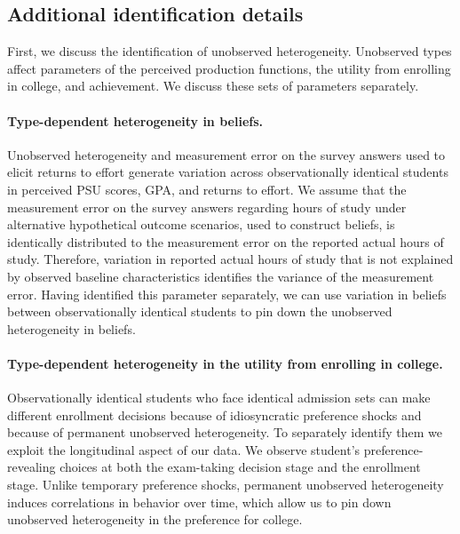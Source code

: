 \subsection{Additional identification details}\label{sec:appendix_identification}

First, we discuss the identification of unobserved heterogeneity. Unobserved types affect parameters of the perceived production functions, the utility from enrolling in college, and achievement. We discuss these sets of parameters separately.\par
\vspace{-10pt}
\paragraph{Type-dependent heterogeneity in beliefs.} Unobserved heterogeneity and measurement error on the survey answers used to elicit returns to effort generate variation across observationally identical students in perceived PSU scores, GPA, and returns to effort. We assume that the measurement error on the survey answers regarding hours of study under alternative hypothetical outcome scenarios, used to construct beliefs, is identically distributed to the measurement error on the reported actual hours of study. Therefore, variation in reported actual hours of study that is not explained by observed baseline characteristics identifies the variance of the measurement error. Having identified this parameter separately, we can use variation in beliefs between observationally identical students to pin down the unobserved heterogeneity in beliefs.\par 
\vspace{-10pt}
\paragraph{Type-dependent heterogeneity in the utility from enrolling in college.} Observationally identical students who face identical admission sets can make different enrollment decisions because of idiosyncratic preference shocks and because of permanent unobserved heterogeneity. To separately identify them we exploit the longitudinal aspect of our data. We observe student's preference-revealing choices at both the exam-taking decision stage and the enrollment stage. Unlike temporary preference shocks, permanent unobserved heterogeneity induces correlations in behavior over time, which allow us to pin down unobserved heterogeneity in the preference for college.\par 
\vspace{-10pt}
